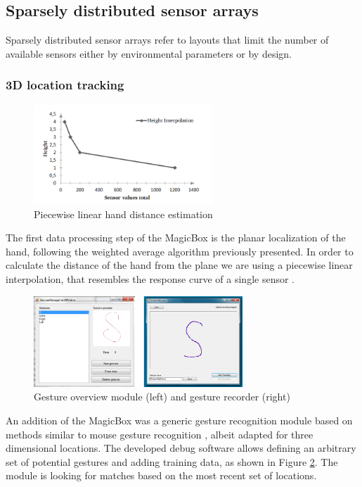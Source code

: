 \subsection{Sparsely distributed sensor arrays}
Sparsely distributed sensor arrays refer to layouts that limit the number of available sensors either by environmental parameters or by design. 
\subsubsection{3D location tracking}
 \begin{figure}[h]
\centering
\includegraphics[width=0.6\textwidth]{images/magicbox_data_zaxis}
\caption{Piecewise linear hand distance estimation \cite{Braun2011MultiInputDevice}}
\label{fig:magicbox_data_zaxis}
\end{figure}
The first data processing step of the MagicBox is the planar localization of the hand, following the weighted average algorithm previously presented. In order to calculate the distance of the hand from the plane we are using a piecewise linear interpolation, that resembles the response curve of a single sensor \cite{Braun2011MultiInputDevice}.
\begin{figure}[h]
\centering
\includegraphics[width=0.7\textwidth]{images/magicbox_data_gest}
\caption{Gesture overview module (left) and gesture recorder (right)}
\label{fig:magicbox_data_gest}
\end{figure}
An addition of the MagicBox was a generic gesture recognition module based on methods similar to mouse gesture recognition \cite{braun2013capacitive}, albeit adapted for three dimensional locations. The developed debug software allows defining an arbitrary set of potential gestures and adding training data, as shown in Figure \ref{fig:magicbox_data_gest}. The module is looking for matches based on the most recent set of locations. 
